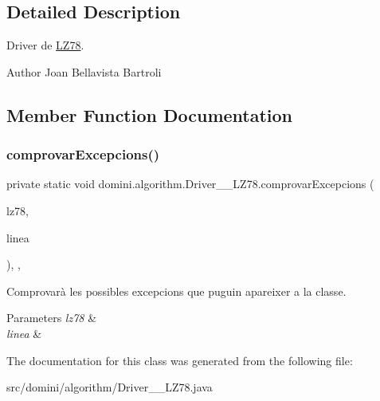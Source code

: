 \subsection{Detailed Description}
Driver de \hyperlink{classdomini_1_1algorithm_1_1LZ78}{L\+Z78}. 

\begin{DoxyAuthor}{Author}
Joan Bellavista Bartroli 
\end{DoxyAuthor}


\subsection{Member Function Documentation}
\mbox{\label{classdomini_1_1algorithm_1_1Driver____LZ78_a21b185a3310ced322a1eb1b49f889f15}} 
\subsubsection{\texorpdfstring{comprovar\+Excepcions()}{comprovarExcepcions()}}
{\footnotesize\ttfamily private static void domini.\+algorithm.\+Driver\+\_\+\+\_\+\+L\+Z78.\+comprovar\+Excepcions (\begin{DoxyParamCaption}\item[{\hyperlink{classdomini_1_1algorithm_1_1LZ78}{L\+Z78}}]{lz78,  }\item[{String}]{linea }\end{DoxyParamCaption})\hspace{0.3cm}{\ttfamily [inline]}, {\ttfamily [static]}, {\ttfamily [private]}}



Comprovarà les possibles excepcions que puguin apareixer a la classe. 


\begin{DoxyParams}{Parameters}
{\em lz78} & \\
\hline
{\em linea} & \\
\hline
\end{DoxyParams}


The documentation for this class was generated from the following file\+:\begin{DoxyCompactItemize}
\item 
src/domini/algorithm/Driver\+\_\+\+\_\+\+L\+Z78.\+java\end{DoxyCompactItemize}
